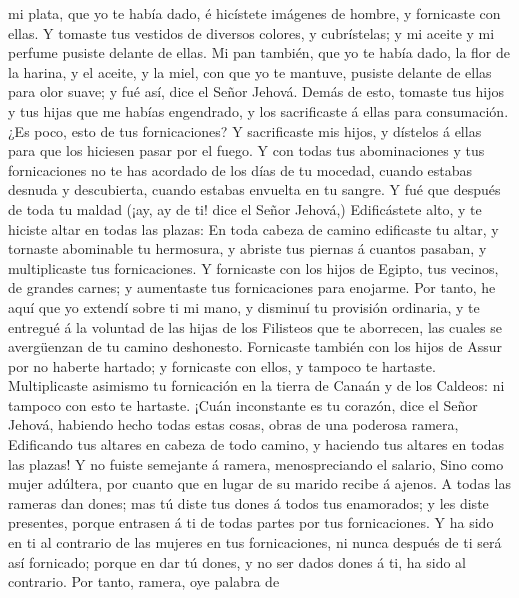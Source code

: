 mi plata, que yo te había dado, é hicístete imágenes de hombre, y
fornicaste con ellas.  Y tomaste tus vestidos de diversos
colores, y cubrístelas; y mi aceite y mi perfume pusiste delante de
ellas.  Mi pan también, que yo te había dado, la flor de la
harina, y el aceite, y la miel, con que yo te mantuve, pusiste delante
de ellas para olor suave; y fué así, dice el Señor Jehová. 
Demás de esto, tomaste tus hijos y tus hijas que me habías engendrado, y
los sacrificaste á ellas para consumación. ¿Es poco, esto de tus
fornicaciones?  Y sacrificaste mis hijos, y dístelos á
ellas para que los hiciesen pasar por el fuego.  Y con
todas tus abominaciones y tus fornicaciones no te has acordado de los
días de tu mocedad, cuando estabas desnuda y descubierta, cuando estabas
envuelta en tu sangre.  Y fué que después de toda tu maldad
(¡ay, ay de ti! dice el Señor Jehová,)  Edificástete alto,
y te hiciste altar en todas las plazas:  En toda cabeza de
camino edificaste tu altar, y tornaste abominable tu hermosura, y
abriste tus piernas á cuantos pasaban, y multiplicaste tus
fornicaciones.  Y fornicaste con los hijos de Egipto, tus
vecinos, de grandes carnes; y aumentaste tus fornicaciones para
enojarme.  Por tanto, he aquí que yo extendí sobre ti mi
mano, y disminuí tu provisión ordinaria, y te entregué á la voluntad de
las hijas de los Filisteos que te aborrecen, las cuales se avergüenzan
de tu camino deshonesto.  Fornicaste también con los hijos
de Assur por no haberte hartado; y fornicaste con ellos, y tampoco te
hartaste.  Multiplicaste asimismo tu fornicación en la
tierra de Canaán y de los Caldeos: ni tampoco con esto te hartaste.
 ¡Cuán inconstante es tu corazón, dice el Señor Jehová,
habiendo hecho todas estas cosas, obras de una poderosa ramera,
 Edificando tus altares en cabeza de todo camino, y
haciendo tus altares en todas las plazas! Y no fuiste semejante á
ramera, menospreciando el salario,  Sino como mujer
adúltera, por cuanto que en lugar de su marido recibe á ajenos.
 A todas las rameras dan dones; mas tú diste tus dones á
todos tus enamorados; y les diste presentes, porque entrasen á ti de
todas partes por tus fornicaciones.  Y ha sido en ti al
contrario de las mujeres en tus fornicaciones, ni nunca después de ti
será así fornicado; porque en dar tú dones, y no ser dados dones á ti,
ha sido al contrario.  Por tanto, ramera, oye palabra de
